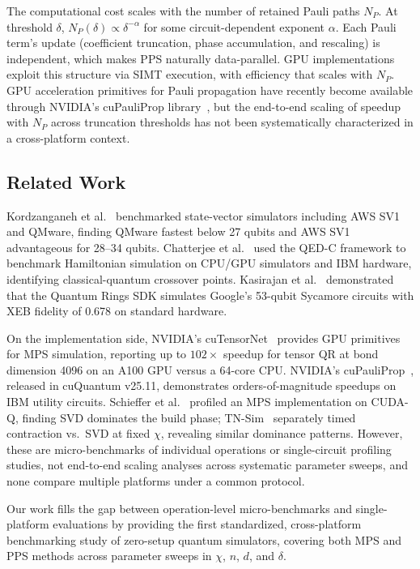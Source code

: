 \documentclass[conference,10pt]{IEEEtran}
\begin{document}
    The computational cost scales with the number of retained Pauli paths $N_P$. At threshold $\delta$, $N_{P}(\delta) \propto \delta^{-\alpha}$ for some circuit-dependent exponent $\alpha$. Each Pauli term's update (coefficient truncation, phase accumulation, and rescaling) is independent, which makes PPS naturally data-parallel. GPU implementations exploit this structure via SIMT execution, with efficiency that scales with $N_P$. GPU acceleration primitives for Pauli propagation have recently become available through NVIDIA's cuPauliProp library~\cite{lowell2025cuquantum}, but the end-to-end scaling of speedup with $N_P$ across truncation thresholds has not been systematically characterized in a cross-platform context.

    \subsection{Related Work}

    Kordzanganeh et al.~\cite{kordzanganeh2023benchmarking} benchmarked state-vector simulators including AWS SV1 and QMware, finding QMware fastest below 27 qubits and AWS SV1 advantageous for 28--34 qubits. Chatterjee et al.~\cite{chatterjee2024hamiltonian} used the QED-C framework to benchmark Hamiltonian simulation on CPU/GPU simulators and IBM hardware, identifying classical-quantum crossover points. Kasirajan et al.~\cite{kasirajan2024sycamore} demonstrated that the Quantum Rings SDK simulates Google's 53-qubit Sycamore circuits with XEB fidelity of 0.678 on standard hardware.
 
    On the implementation side, NVIDIA's cuTensorNet~\cite{bayraktar2023cuquantum} provides GPU primitives for MPS simulation, reporting up to $102\times$ speedup for tensor QR at bond dimension 4096 on an A100 GPU versus a 64-core CPU. NVIDIA's cuPauliProp~\cite{lowell2025cuquantum}, released in cuQuantum v25.11, demonstrates orders-of-magnitude speedups on IBM utility circuits. Schieffer et al.~\cite{schieffer2025harnessingcudaqsmpstensor} profiled an MPS implementation on CUDA-Q, finding SVD dominates the build phase; TN-Sim~\cite{hoyt2026tnsim} separately timed contraction vs.\ SVD at fixed $\chi$, revealing similar dominance patterns. However, these are micro-benchmarks of individual operations or single-circuit profiling studies, not end-to-end scaling analyses across systematic parameter sweeps, and none compare multiple platforms under a common protocol.
     
    Our work fills the gap between operation-level micro-benchmarks and single-platform evaluations by providing the first standardized, cross-platform benchmarking study of zero-setup quantum simulators, covering both MPS and PPS methods across parameter sweeps in $\chi$, $n$, $d$, and $\delta$.
 
\end{document}
